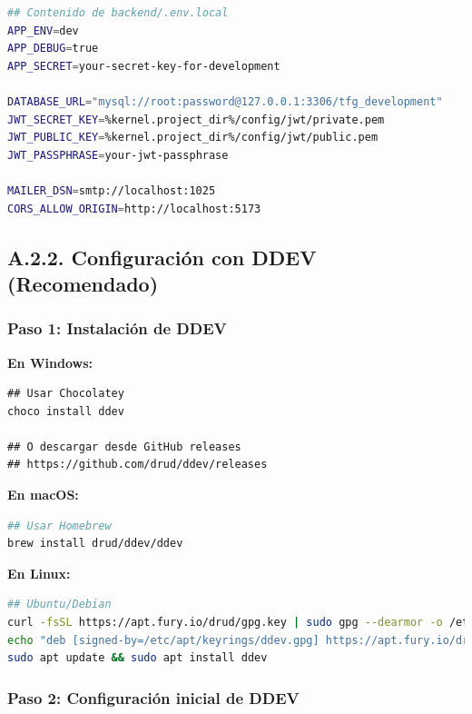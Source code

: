 \documentclass[12pt,a4paper,oneside]{report}
\begin{document}
\begin{lstlisting}[language=bash]
## Contenido de backend/.env.local
APP_ENV=dev
APP_DEBUG=true
APP_SECRET=your-secret-key-for-development

DATABASE_URL="mysql://root:password@127.0.0.1:3306/tfg_development"
JWT_SECRET_KEY=%kernel.project_dir%/config/jwt/private.pem
JWT_PUBLIC_KEY=%kernel.project_dir%/config/jwt/public.pem
JWT_PASSPHRASE=your-jwt-passphrase

MAILER_DSN=smtp://localhost:1025
CORS_ALLOW_ORIGIN=http://localhost:5173
\end{lstlisting}

\subsection{A.2.2. Configuración con DDEV
(Recomendado)}\label{a.2.2.-configuraciuxf3n-con-ddev-recomendado}

\subsubsection{Paso 1: Instalación de
DDEV}\label{paso-1-instalaciuxf3n-de-ddev}

\textbf{En Windows:}

\begin{lstlisting}
## Usar Chocolatey
choco install ddev

## O descargar desde GitHub releases
## https://github.com/drud/ddev/releases
\end{lstlisting}

\textbf{En macOS:}

\begin{lstlisting}[language=bash]
## Usar Homebrew
brew install drud/ddev/ddev
\end{lstlisting}

\textbf{En Linux:}

\begin{lstlisting}[language=bash]
## Ubuntu/Debian
curl -fsSL https://apt.fury.io/drud/gpg.key | sudo gpg --dearmor -o /etc/apt/keyrings/ddev.gpg
echo "deb [signed-by=/etc/apt/keyrings/ddev.gpg] https://apt.fury.io/drud/ * *" | sudo tee /etc/apt/sources.list.d/ddev.list
sudo apt update && sudo apt install ddev
\end{lstlisting}

\subsubsection{Paso 2: Configuración inicial de
DDEV}\label{paso-2-configuraciuxf3n-inicial-de-ddev}
\end{document}
